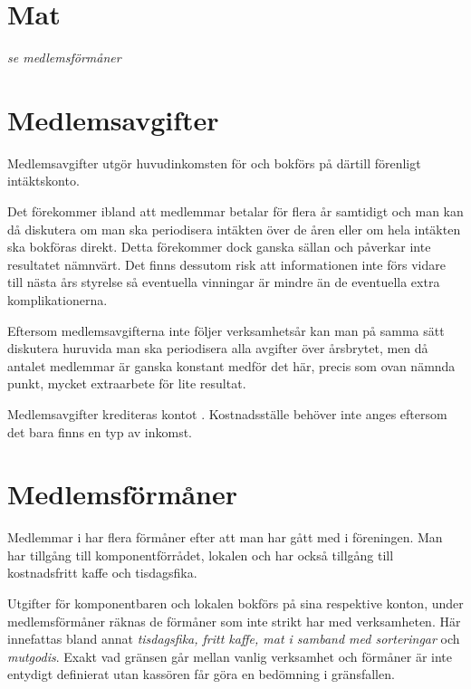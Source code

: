 				\section{Mat}
				\emph{se medlemsförmåner}
			
				\section{Medlemsavgifter}
				
				Medlemsavgifter utgör huvudinkomsten för  och bokförs på därtill förenligt intäktskonto.
		
		Det förekommer ibland att medlemmar betalar för flera år samtidigt och man kan då diskutera om man ska periodisera intäkten över de åren eller om hela intäkten ska bokföras direkt. Detta förekommer dock ganska sällan och påverkar inte resultatet nämnvärt. Det finns dessutom risk att informationen inte förs vidare till nästa års styrelse så eventuella vinningar är mindre än de eventuella extra komplikationerna.
		
		Eftersom medlemsavgifterna inte följer verksamhetsår kan man på samma sätt diskutera huruvida man ska periodisera alla avgifter över årsbrytet, men då antalet medlemmar är ganska konstant medför det här, precis som ovan nämnda punkt, mycket extraarbete för lite resultat.
		
					\begin{redovisning}
						Medlemsavgifter krediteras kontot . Kostnadsställe behöver inte anges eftersom det bara finns en typ av inkomst.
					\end{redovisning}
				
				\section{Medlemsförmåner}
				
				
				Medlemmar i  har flera förmåner efter att man har gått med i föreningen. Man har tillgång till komponentförrådet, lokalen och har också tillgång till kostnadsfritt kaffe och tisdagsfika.
		
		Utgifter för komponentbaren och lokalen bokförs på sina respektive konton, under medlemsförmåner räknas de förmåner som inte strikt har med verksamheten. Här innefattas bland annat \emph{tisdagsfika, fritt kaffe, mat i samband med sorteringar} och \emph{mutgodis}. Exakt vad gränsen går mellan vanlig verksamhet och förmåner är inte entydigt definierat utan kassören får göra en bedömning i gränsfallen.
		
